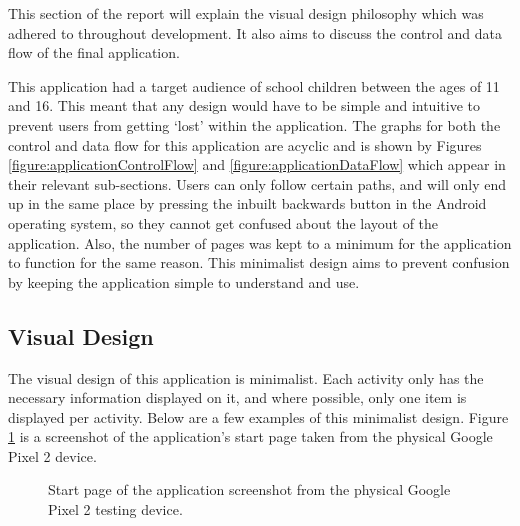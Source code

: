 \documentclass{article}
\begin{document}
This section of the report will explain the visual design philosophy which was adhered to throughout development. It also aims to discuss the control and data flow of the final application. \par

This application had a target audience of school children between the ages of 11 and 16. This meant that any design would have to be simple and intuitive to prevent users from getting `lost' within the application. The graphs for both the control and data flow for this application are acyclic and is shown by Figures \ref{figure:applicationControlFlow} and \ref{figure:applicationDataFlow} which appear in their relevant sub-sections. Users can only follow certain paths, and will only end up in the same place by pressing the inbuilt backwards button in the Android operating system, so they cannot get confused about the layout of the application. Also, the number of pages was kept to a minimum for the application to function for the same reason. This minimalist design aims to prevent confusion by keeping the application simple to understand and use. \par

\subsection{Visual Design}

The visual design of this application is minimalist. Each activity only has the necessary information displayed on it, and where possible, only one item is displayed per activity. Below are a few examples of this minimalist design. Figure \ref{figure:applicationStartPage} is a screenshot of the application's start page taken from the physical Google Pixel 2 device.

\begin{figure}[H]
	\centering
	\caption{Start page of the application screenshot from the physical Google Pixel 2 testing device.}
	\label{figure:applicationStartPage}
\end{figure}
\end{document}
